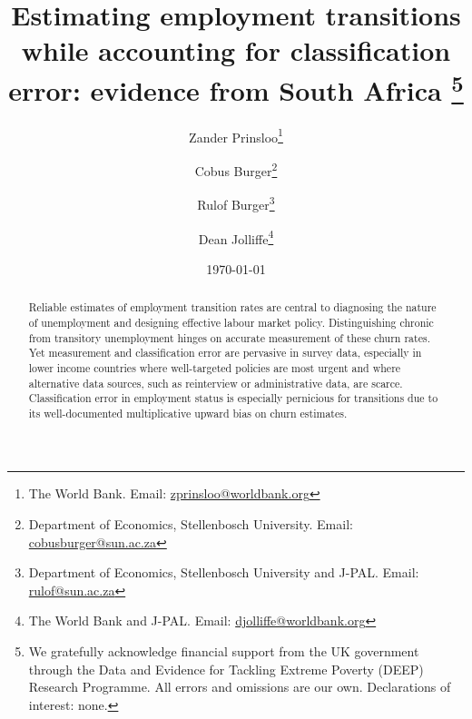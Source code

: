 \documentclass[letterpaper,12pt,final]{article}
\title{Estimating employment transitions while accounting for
  classification error: evidence from South Africa%
  \thanks{We gratefully acknowledge financial support from the UK government
    through the Data and Evidence for Tackling Extreme Poverty (DEEP) Research
    Programme. All errors and omissions are our own.
    Declarations of interest: none.}}
\author{
  Zander Prinsloo\thanks{The World Bank. Email: \href{mailto:zprinsloo@worldbank.org}{zprinsloo@worldbank.org}}
  \and
  Cobus Burger\thanks{Department of Economics, Stellenbosch University.
    Email: \href{mailto:cobusburger@sun.ac.za}{cobusburger@sun.ac.za}}
  \and
  Rulof Burger\thanks{Department of Economics, Stellenbosch University and J-PAL.
    Email: \href{mailto:rulof@sun.ac.za}{rulof@sun.ac.za}}
  \and
  Dean Jolliffe\thanks{The World Bank and J-PAL.
    Email: \href{mailto:djolliffe@worldbank.org}{djolliffe@worldbank.org}}
}
\date{\today}
\begin{document}

\maketitle

\begin{abstract}
Reliable estimates of employment transition rates are central to diagnosing the
nature of unemployment and designing effective labour market policy. Distinguishing
chronic from transitory unemployment hinges on accurate measurement of these churn
rates. Yet measurement and classification error are pervasive in survey data, 
especially in lower income countries where well-targeted policies are most urgent 
and where alternative data sources, such as reinterview or administrative data, are 
scarce. Classification error in employment status is especially pernicious 
for transitions due to its well-documented multiplicative upward bias on churn estimates.


\end{abstract}
\end{document}
